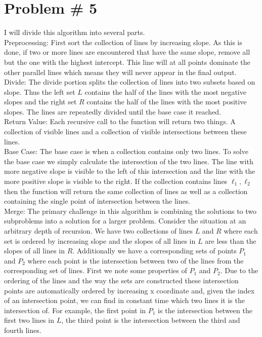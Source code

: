 \documentclass{article}
\begin{document}
\section*{Problem \# 5}
I will divide this algorithm into several parts.\\

Preprocessing: First sort the collection of lines by increasing slope. As this is done, if two or more lines are encountered that have the same slope, remove all but the one with the highest intercept. This line will at all points dominate the other parallel lines which means they will never appear in the final output.\\

Divide: The divide portion splits the collection of lines into two subsets based on slope. Thus the left set $L$ contains the half of the lines with the most negative slopes and the right set $R$ contains the half of the lines with the most positive slopes. The lines are repeatedly divided until the base case it reached. \\

Return Value: Each recursive call to the function will return two things. A collection of visible lines and a collection of visible intersections between these lines.\\

Base Case: The base case is when a collection contains only two lines. To solve the base case we simply calculate the intersection of the two lines. The line with more negative slope is visible to the left of this intersection and the line with the more positive slope is visible to the right. If the collection contains lines $\ell_1, \ell_2$ then the function will return the same collection of lines as well as a collection containing the single point of intersection between the lines.\\

Merge: The primary challenge in this algorithm is combining the solutions to two subproblems into a solution for a larger problem. Consider the situation at an arbitrary depth of recursion. We have two collections of lines $L$ and $R$ where each set is ordered by increasing slope and the slopes of all lines in $L$ are less than the slopes of all lines in $R$. Additionally we have a corresponding sets of points $P_1$ and $P_2$ where each point is the intersection between two of the lines from the corresponding set of lines. First we note some properties of $P_1$ and $P_2$. Due to the ordering of the lines and the way the sets are constructed these intersection points are automatically ordered by increasing x coordinate and, given the index of an intersection point, we can find in constant time which two lines it is the intersection of. For example, the first point in $P_1$ is the intersection between the first two lines in $L$, the third point is the intersection between the third and fourth lines.\\
\end{document}
